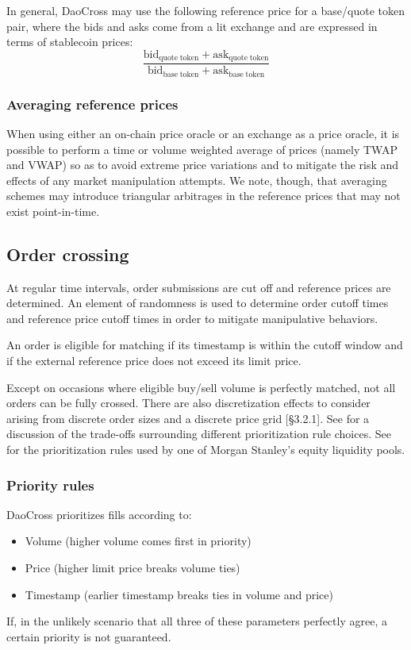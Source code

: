 \documentclass[11pt, reqno]{amsart}
\theoremstyle{definition}
\theoremstyle{remark}
\newcommand{\bidbase}{\mathrm{bid}_\mathrm{quote\;token}}
\newcommand{\askbase}{\mathrm{ask}_\mathrm{quote\;token}}
\newcommand{\bidquote}{\mathrm{bid}_\mathrm{base\;token}}
\newcommand{\askquote}{\mathrm{ask}_\mathrm{base\;token}}
\begin{document}
In general, DaoCross may use the following reference price for a base/quote
token pair, where the bids and asks come from a lit exchange and are expressed
in terms of stablecoin prices:
\begin{equation}
	\frac{\bidbase + \askbase}{\bidquote + \askquote}
\end{equation}

\subsubsection{Averaging reference prices}
When using either an on-chain price oracle or an exchange as a price oracle,
it is possible to perform a time or volume weighted average of prices (namely
TWAP and VWAP) so as to avoid extreme price variations and to mitigate the risk
and effects of any market manipulation attempts. We note, though, that
averaging schemes may introduce triangular arbitrages in the reference prices
that may not exist point-in-time.

\subsection{Order crossing}
At regular time intervals, order submissions are cut off and reference prices
are determined. An element of randomness is used to determine order cutoff
times and reference price cutoff times in order to
mitigate manipulative behaviors.

An order is eligible for matching if its timestamp is within the cutoff window
and if the external reference price does not exceed its limit price.

Except on occasions where eligible buy/sell volume is perfectly matched, not
all orders can be fully crossed. There are also discretization effects to
consider arising from discrete order sizes and a discrete price grid
\cite{BoBoDoGo18}[\S 3.2.1].
See \cite{BeLaLiVa22} for a discussion of the trade-offs surrounding
different prioritization rule choices. See \cite{MsAts} for the
prioritization rules used by one of Morgan Stanley's equity liquidity pools.

\subsubsection{Priority rules}
DaoCross prioritizes fills according to:
\begin{itemize}
	\item Volume (higher volume comes first in priority)
	\item Price (higher limit price breaks volume ties)
	\item Timestamp (earlier timestamp breaks ties in volume and price)
\end{itemize}
If, in the unlikely scenario that all three of these parameters perfectly
agree, a certain priority is not guaranteed.
\end{document}
